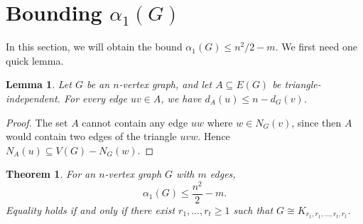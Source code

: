 \documentclass{amsart}
\renewcommand{\subset}{\subseteq}
\newcommand{\iso}{\cong}
\newcommand{\lfrac}[2]{#1/#2}
\newcommand{\aph}{\alpha_1}
\newtheorem{lemma}[proposition]{Lemma}
\newtheorem{theorem}[proposition]{Theorem}
\theoremstyle{definition}
\theoremstyle{remark}
\begin{document}
\section{Bounding $\aph(G)$}\label{sec:aphbound}
In this section, we will obtain the bound $\aph(G) \leq \lfrac{n^2}{2} - m$.
We first need one quick lemma.
\begin{lemma}\label{lem:vertmax}
  Let $G$ be an $n$-vertex graph, and let $A \subset E(G)$ be
  triangle-independent.  For every edge $uv \in A$, we have $d_A(u)
  \leq n - d_G(v)$.
\end{lemma}
\begin{proof}
  The set $A$ cannot contain any edge $uw$ where $w \in N_G(v)$, since
  then $A$ would contain two edges of the triangle $uvw$. Hence $N_A(u) \subset V(G) - N_G(w)$.
\end{proof}
\begin{theorem}\label{thm:match}
  For an $n$-vertex graph $G$ with $m$ edges,
  \[ \aph(G) \leq \frac{n^2}{2} - m. \]
  Equality holds if and only if there exist $r_1, \ldots, r_t \geq 1$
  such that $G \iso K_{r_1,r_1,\ldots,r_t,r_t}$.
\end{theorem}
\end{document}
